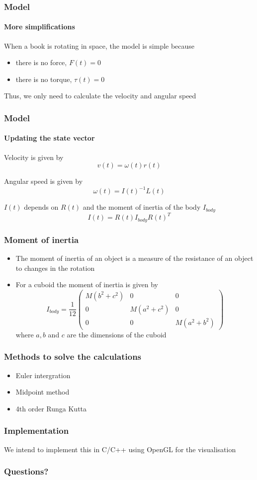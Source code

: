 \documentclass{beamer}
\begin{document}
\begin{frame}
 \frametitle{Model}
 \framesubtitle{More simplifications}
 When a book is rotating in space, the model is simple because
 \begin{itemize}
  \item there is no force, $F(t) = 0$
  \item there is no torque, $\tau(t) = 0$
 \end{itemize}
 Thus, we only need to calculate the velocity and angular speed
\end{frame}

\begin{frame}
 \frametitle{Model}
 \framesubtitle{Updating the state vector}
 Velocity is given by
 \begin{displaymath}
  v(t) = \omega(t) r(t)
 \end{displaymath}
 
 Angular speed is given by
 \begin{displaymath}
  \omega(t) = I(t)^{-1} L(t)
 \end{displaymath}

 $I(t)$ depends on $R(t)$ and the moment of inertia of the body $I_{body}$
 \begin{displaymath}
  I(t) = R(t) I_{body} R(t)^{T}
 \end{displaymath}
\end{frame}

\begin{frame}
 \frametitle{Moment of inertia}
 \begin{itemize}
  \item 
  The moment of inertia of an object is a measure of the resistance of an object to changes in the rotation

  \item
  For a cuboid the moment of inertia is given by
  \begin{displaymath}
    I_{body} = \frac{1}{12} \begin{pmatrix}
			    M(b^2 + c^2) & 0 & 0 \\
			    0 & M(a^2 + c^2) & 0 \\
			    0 & 0 & M(a^2 + b^2)
			    \end{pmatrix}
  \end{displaymath}
  where $a, b$ and $c$ are the dimensions of the cuboid
 \end{itemize}
\end{frame}

\begin{frame}
 \frametitle{Methods to solve the calculations}
 \begin{itemize}
  \item Euler intergration
  \item Midpoint method
  \item 4th order Runga Kutta
 \end{itemize}
\end{frame}

\begin{frame}
 \frametitle{Implementation}
 We intend to implement this in C/C++ using OpenGL for the visualisation
\end{frame}

 \begin{frame}
  \frametitle{Questions?}
 \end{frame}
\end{document}
